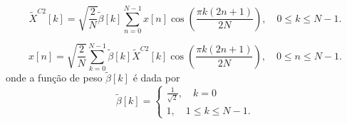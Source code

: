 \begin{frame}[allowframebreaks]
        \begin{equation}
        \tilde{X}^{C2}[k] = \sqrt{\frac{2}{N}} \tilde{\beta}[k] \sum_{n=0}^{N-1} x[n] \cos \left( \frac{\pi k (2n+1)}{2N} \right), \quad 0 \leq k \leq N-1 .
        \end{equation}

        \begin{equation}
        x[n] = \sqrt{\frac{2}{N}} \sum_{k=0}^{N-1} \tilde{\beta}[k] \tilde{X}^{C2}[k] \cos \left( \frac{\pi k (2n+1)}{2N} \right), \quad 0 \leq n \leq N-1 .
        \end{equation}
        onde a função de peso $\tilde{\beta}[k]$ é dada por
        \begin{equation}
        \tilde{\beta}[k] = \begin{cases} \frac{1}{\sqrt{2}} , \quad k = 0 \\ 1 , \quad 1 \leq k \leq N - 1 . \end{cases}
        \end{equation}
\end{frame}


